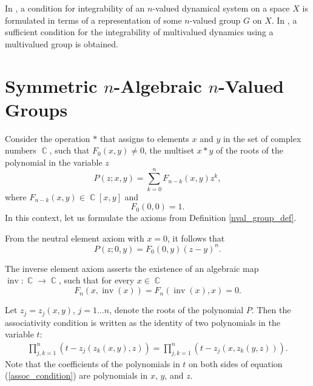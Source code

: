\documentclass[14pt, dvipsnames]{extarticle}
\theoremstyle{definition}
\theoremstyle{definition}
\theoremstyle{remark}
\DeclareMathOperator{\inv}{\mathrm{inv}}
\DeclareMathOperator{\Cc}{\mathbb{C}}
\begin{document}
In \cite{Buchstaber_Veselov}, a condition for integrability of an $n$-valued dynamical system on a space $X$ is formulated in terms of a representation of some $n$-valued group $G$ on $X$. In \cite{Yagodovskii}, a sufficient condition for the integrability of multivalued dynamics using a multivalued group is obtained.











\section{Symmetric $n$-Algebraic $n$-Valued Groups}\label{symmetric_n-algebraic_n-valued_groups}

Consider the operation $\ast$ that assigns to elements $x$ and $y$ in the set of complex numbers $\Cc$, such that $F_0(x, y)\neq 0$, the multiset $x\ast y$ of the roots of the polynomial in the variable $z$
\begin{equation}\label{polynom_P}
P(z; x, y) = \sum\limits_{k = 0}^nF_{n-k}(x, y)z^{k},
\end{equation}
where $F_{n-k}(x,y)\in\Cc[x, y]$ and
\begin{equation}\label{F_0(0, 0)=1}
F_0(0, 0) = 1.
\end{equation}
 In this context, let us formulate the axioms from Definition \ref{nval_group_def}.

From the neutral element axiom with $x = 0$, it follows that
\begin{equation}\label{G(P)_neutral_element}
P(z; 0, y) = F_0(0, y)(z - y)^n.
\end{equation}

The inverse element axiom asserts the existence of an algebraic map $\inv: \Cc\to \Cc$, such that for every $x\in\Cc$
\begin{equation}\label{G(P)_inverse_element}
F_n(x, \inv(x)) = F_n(\inv(x), x) = 0.
\end{equation}

Let $z_j = z_j(x, y)$, $j = 1\dots n$, denote the roots of the polynomial $P$. Then the associativity condition is written as the identity of two polynomials in the variable $t$:
\begin{equation}\label{assoc_condition}
\begin{aligned}
\prod\limits_{j, k = 1}^n (t - z_j(z_k(x, y), z)) = \prod\limits_{j, k = 1}^n (t - z_j(x, z_k(y, z))).
\end{aligned}
\end{equation}
Note that the coefficients of the polynomials in $t$ on both sides of equation (\ref{assoc_condition}) are polynomials in $x$, $y$, and $z$.
\end{document}
